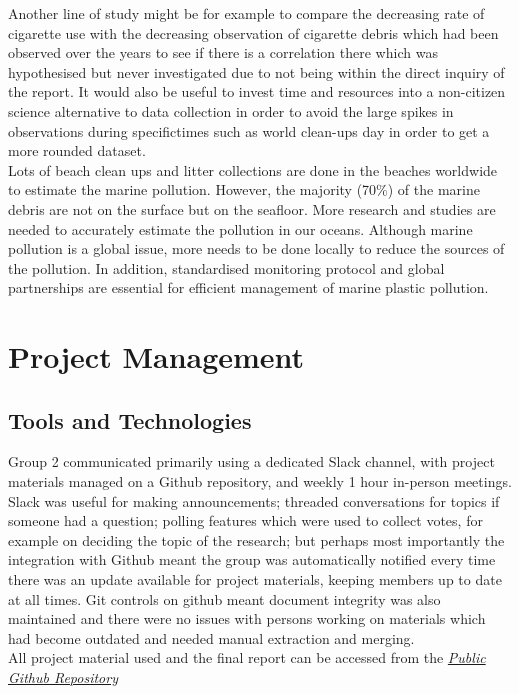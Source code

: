\documentclass[10pt]{article}\usepackage[]{graphicx}\usepackage[]{color}
\begin{document}
Another line of study might be for example to compare the decreasing rate of cigarette use with the decreasing observation of cigarette debris which had been observed over the years to see if there is a correlation there which was hypothesised but never investigated due to not being within the direct inquiry of the report. It would also be useful to invest time and resources into a non-citizen science alternative to data collection in order to avoid the large spikes in observations during specifictimes such as world clean-ups day in order to get a more rounded dataset.   \\  

Lots of beach clean ups and litter collections are done in the beaches worldwide to estimate the marine pollution. However, the majority (70\%) of the marine debris are not on the surface but on the seafloor. More research and studies are needed to accurately estimate the pollution in our oceans. Although marine pollution is a global issue, more needs to be done locally to reduce the sources of the pollution. In addition, standardised monitoring protocol and global partnerships are   essential for efficient management of marine plastic pollution. \\


\pagebreak
\section{Project Management}\label{mgt}
\subsection{Tools and Technologies}
Group 2 communicated primarily using a dedicated Slack channel, with project materials managed on a Github repository, and weekly 1 hour in-person meetings. Slack was useful for making announcements; threaded conversations for topics if someone had a question; polling features which were used to collect votes, for example on deciding the topic of the research; but perhaps most importantly the integration with Github meant the group was automatically notified every time there was an update available for project materials, keeping members up to date at all times. Git controls on github meant document integrity was also maintained and there were no issues with persons working on materials which had become outdated and needed manual extraction and merging.\\

All project material used and the final report can be accessed from the \textit{\href{https://github.com/KarenJewell/CMM507Group2}{Public Github Repository}} \\
\end{document}
